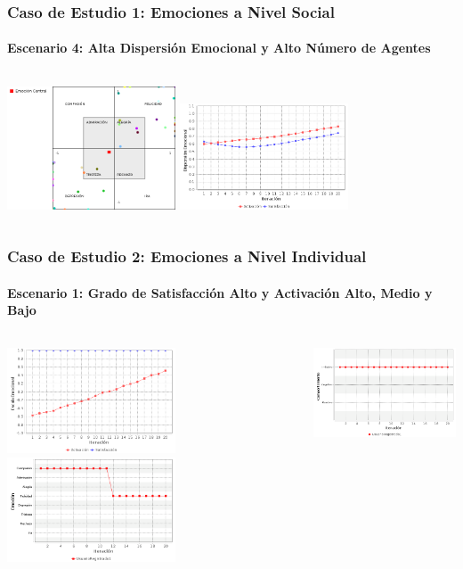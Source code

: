 \documentclass{beamer}
\begin{document}
\begin{frame}
\frametitle{Caso de Estudio 1: Emociones a Nivel Social}
\framesubtitle{Escenario 4: Alta Dispersión Emocional y Alto Número de Agentes}
\begin{columns}
\tiny
\centering
\includegraphics[width=5cm]{ilustraciones/caso1escenario4-emocioncentral-final}
\tiny
\centering
\includegraphics[width=5cm]{ilustraciones/caso1escenario4-dispersionemocional}
\end{columns}
\end{frame}

\begin{frame}
\frametitle{Caso de Estudio 2: Emociones a Nivel Individual}
\framesubtitle{Escenario 1: Grado de Satisfacción Alto y Activación Alto, Medio y Bajo}
\begin{columns}
\tiny
\centering
\includegraphics[width=5cm]{ilustraciones/caso2escenerio1-estado-emocional-colaborador1}
\tiny
\centering
\includegraphics[width=5cm]{ilustraciones/caso2escenerio1-modificacion-de-emociones}

\includegraphics[width=5cm]{ilustraciones/caso2escenerio1-modificacion-de-comportamiento}
\end{columns}
\end{frame}
\end{document}
